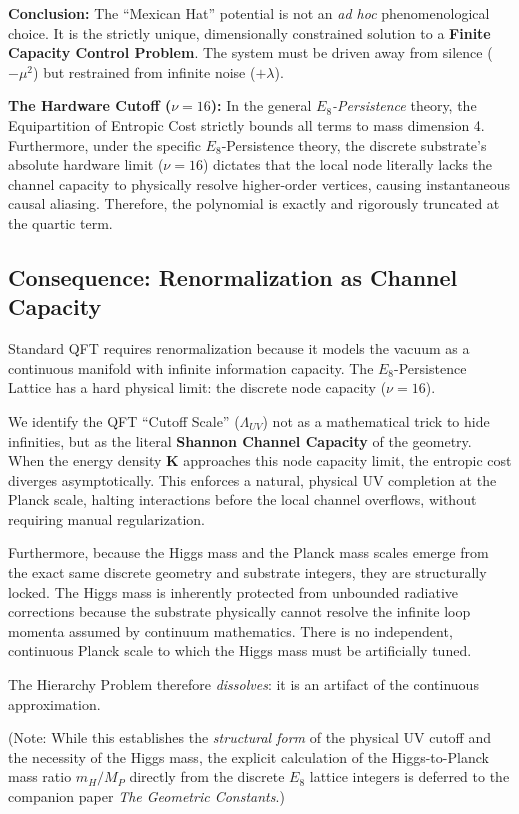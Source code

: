 \textbf{Conclusion:} The ``Mexican Hat'' potential is not an \textit{ad hoc} phenomenological choice. It is the strictly unique, dimensionally constrained solution to a \textbf{Finite Capacity Control Problem}. The system must be driven away from silence ($-\mu^2$) but restrained from infinite noise ($+\lambda$). 

\textbf{The Hardware Cutoff ($\nu=16$):}  In the general \textit{$E_8$-Persistence} theory, the Equipartition of Entropic Cost strictly bounds all terms to mass dimension 4. Furthermore, under the specific $E_8$-Persistence theory, the discrete substrate's absolute hardware limit ($\nu=16$) dictates that the local node literally lacks the channel capacity to physically resolve higher-order vertices, causing instantaneous causal aliasing. Therefore, the polynomial is exactly and rigorously truncated at the quartic term.

\subsection{Consequence: Renormalization as Channel Capacity}
\label{subsec:uv_completion}

Standard QFT requires renormalization because it models the vacuum as a continuous manifold with infinite information capacity. The $E_8$-Persistence Lattice has a hard physical limit: the discrete node capacity ($\nu=16$).

We identify the QFT ``Cutoff Scale'' ($\Lambda_{UV}$) not as a mathematical trick to hide infinities, but as the literal \textbf{Shannon Channel Capacity} of the geometry. When the energy density $\mathbf{K}$ approaches this node capacity limit, the entropic cost diverges asymptotically. This enforces a natural, physical UV completion at the Planck scale, halting interactions before the local channel overflows, without requiring manual regularization.

Furthermore, because the Higgs mass and the Planck mass scales emerge from the exact same discrete geometry and substrate integers, they are structurally locked. The Higgs mass is inherently protected from unbounded radiative corrections because the substrate physically cannot resolve the infinite loop momenta assumed by continuum mathematics. There is no independent, continuous Planck scale to which the Higgs mass must be artificially tuned. 

The Hierarchy Problem therefore \textit{dissolves}: it is an artifact of the continuous approximation.

(Note: While this establishes the \textit{structural form} of the physical UV cutoff and the necessity of the Higgs mass, the explicit calculation of the Higgs-to-Planck mass ratio $m_H/M_P$ directly from the discrete $E_8$ lattice integers is deferred to the companion paper \textit{The Geometric Constants}.)